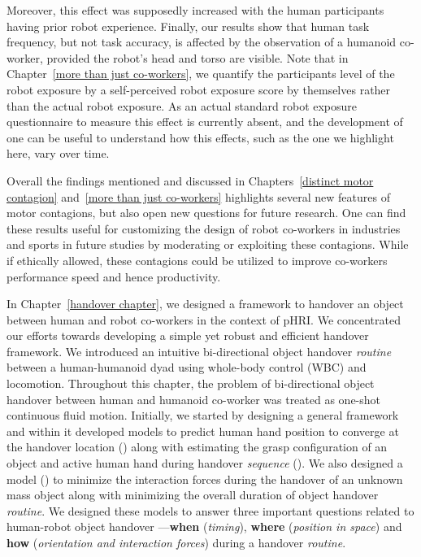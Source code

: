 Moreover, this effect was supposedly increased with the human participants having prior robot experience. Finally, our results show that human task frequency, but not task accuracy, is affected by the observation of a humanoid co-worker, provided the robot's head and torso are visible. Note that in Chapter~\ref{more than just co-workers}, we quantify the participants level of the robot exposure by a self-perceived robot exposure score by themselves rather than the actual robot exposure. As an actual standard robot exposure questionnaire to measure this effect is currently absent, and the development of one can be useful to understand how this effects, such as the one we highlight here, vary over time.

Overall the findings mentioned and discussed in Chapters~\ref{distinct motor contagion} and~\ref{more than just co-workers} highlights several new features of motor contagions, but also open new questions for future research. One can find these results useful for customizing the design of robot co-workers in industries and sports in future studies by moderating or exploiting these contagions. While if ethically allowed, these contagions could be utilized to improve co-workers performance speed and hence productivity.




In Chapter~\ref{handover chapter}, we designed a framework to handover an object between human and robot co-workers in the context of pHRI. We concentrated our efforts towards developing a simple yet robust and efficient handover framework. We introduced an intuitive bi-directional object handover \textit{routine} between a human-humanoid dyad using whole-body control (WBC) and locomotion. Throughout this chapter, the problem of bi-directional object handover between human and humanoid co-worker was treated as one-shot continuous fluid motion. Initially, we started by designing a general framework and within it developed models to predict human hand position to converge at the handover location () along with estimating the grasp configuration of an object and active human hand during handover \textit{sequence} (). We also designed a model () to minimize the interaction forces during the handover of an unknown mass object along with minimizing the overall duration of object handover \textit{routine}. We designed these models to answer three important questions related to human-robot object handover ---\textbf{when} (\textit{timing}), \textbf{where} (\textit{position in space}) and \textbf{how} (\textit{orientation and interaction forces}) during a handover \textit{routine}. 

